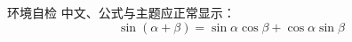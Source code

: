 \documentclass[aspectratio=169,10pt]{beamer}
\begin{document}
\begin{frame}{环境自检}
  中文、公式与主题应正常显示：
  \[
    \sin(\alpha+\beta)=\sin\alpha\cos\beta+\cos\alpha\sin\beta
  \]
\end{frame}
\end{document}
